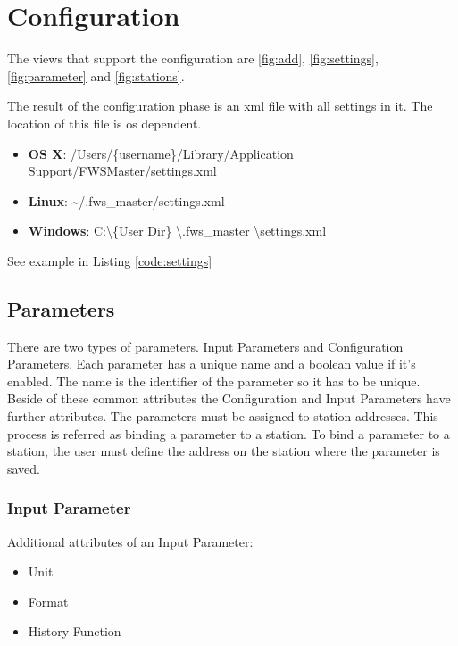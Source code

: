 \section{Configuration} %
\label{sec:configuration} 
The views that support the configuration are \ref{fig:add}, \ref{fig:settings}, \ref{fig:parameter} and \ref{fig:stations}.

The result of the configuration phase is an xml file with all settings in it. The location of this file is os dependent. 
\begin{itemize}
    \item \textbf{OS X}: /Users/\{username\}/Library/Application Support/FWSMaster/settings.xml
    \item \textbf{Linux}: \textasciitilde /.fws\_master/settings.xml
    \item \textbf{Windows}: C:\textbackslash \{User Dir\} \textbackslash .fws\_master \textbackslash settings.xml
\end{itemize}

See example in Listing \ref{code:settings}

{\C  }

\subsection{Parameters} %
\label{sub:parameters}
There are two types of parameters. Input Parameters and Configuration Parameters. Each parameter has a unique name and a boolean value if it's enabled. The name is the identifier of the parameter so it has to be unique. Beside of these common attributes the Configuration and Input Parameters have further attributes. The parameters must be assigned to station addresses. This process is referred as binding a parameter to a station. To bind a parameter to a station, the user must define the address on the station where the parameter is saved.

\subsubsection{Input Parameter} %
\label{ssub:input_parameter}
Additional attributes of an Input Parameter:
\begin{itemize}
	\item Unit
	\item Format
	\item History Function
\end{itemize}

